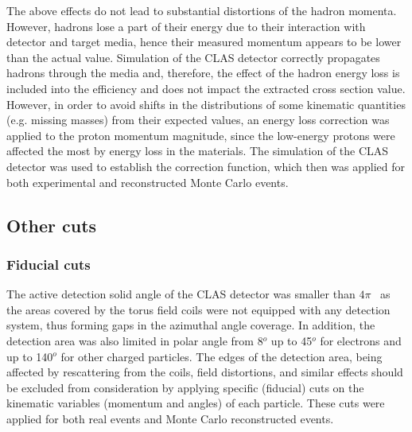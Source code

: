 \documentclass[prc,twocolumn,superscriptaddress,showpacs,amssymb,amsmath,amsfonts,aps,nofootinbib]{revtex4-1}
\begin{document}
The  above effects do not lead to substantial distortions of the hadron momenta. However, hadrons lose a part of their energy due to their interaction with detector and target media, hence their measured momentum appears to be lower than the actual value. 
Simulation of the CLAS detector  correctly propagates hadrons through the media and, therefore, the effect of the hadron energy loss is included into the efficiency and does not impact the extracted cross section value.
However, in order to avoid shifts in the distributions of some kinematic quantities (e.g. missing masses) from their expected values, 
an energy loss correction was applied to the proton momentum magnitude,
 since the low-energy protons were affected the most by energy loss in the materials. The simulation of the CLAS detector was used to establish the correction function, which then was applied for both experimental and reconstructed Monte Carlo events.  


\subsection{Other cuts}

\subsubsection{Fiducial cuts}

The active detection solid angle of the CLAS detector
 was smaller than $4\pi$~\cite{Me03} as the areas covered by the torus field coils
 were not 
equipped with any detection system, thus forming gaps in the azimuthal angle coverage. In addition, the detection area was also limited in polar angle from 8$^{o}$ up to 45$^{o}$ for electrons and up to 140$^{o}$ for other charged particles.
The edges of the detection area, being affected by rescattering from the
coils, field distortions, and similar effects should be excluded from consideration by applying specific (fiducial) cuts on the kinematic variables
(momentum and angles) of each particle. These cuts were applied for both real events and Monte Carlo reconstructed events.
\end{document}
